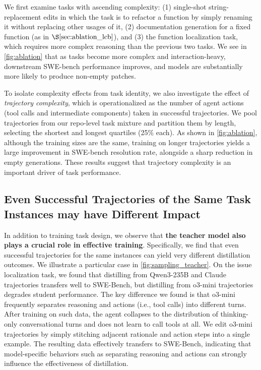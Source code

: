 We first examine tasks with ascending complexity: (1) single-shot string-replacement edits in which the task is to refactor a function by simply renaming it without replacing other usages of it, (2) documentation generation for a fixed function (as in $\S\ref{sec:ablation_lcb}$), and (3) the function localization task, which requires more complex reasoning than the previous two tasks.
We see in \autoref{fig:ablation} that as tasks become more complex and interaction-heavy, downstream SWE-bench performance improves, and models are substantially more likely to produce non-empty patches.


To isolate complexity effects from task identity, we also investigate the effect of \emph{trajectory complexity}, which is operationalized as the number of agent actions (tool calls and intermediate components) taken in successful trajectories.
We pool trajectories from our repo-level task mixture and partition them by length, selecting the shortest and longest quartiles (25\% each). 
As shown in \autoref{fig:ablation}, although the training sizes are the same, training on longer trajectories yields a large improvement in SWE-bench resolution rate, alongside a sharp reduction in empty generations. These results suggest that trajectory complexity is an important driver of task performance.



\subsection{Even Successful Trajectories of the Same Task Instances may have Different Impact}
In addition to training task design, we observe that \textbf{the teacher model also plays a crucial role in effective training}.
Specifically, we find that even successful trajectories for the same instances can yield very different distillation outcomes.
We illustrate a particular case in \autoref{fig:sampling_teacher}. 
On the issue localization task, we found that distilling from Qwen3-235B and Claude trajectories transfers well to SWE-Bench, but distilling from o3-mini trajectories degrades student performance. 
The key difference we found is that o3-mini frequently separates reasoning and actions (i.e., tool calls) into different turns.
After training on such data, the agent collapses to the distribution of thinking-only conversational turns and does not learn to call tools at all.
We edit o3-mini trajectories by simply stitching adjacent rationale and action steps into a single example. The resulting data effectively transfers to SWE-Bench, indicating that model-specific behaviors such as separating reasoning and actions can strongly influence the effectiveness of distillation.


